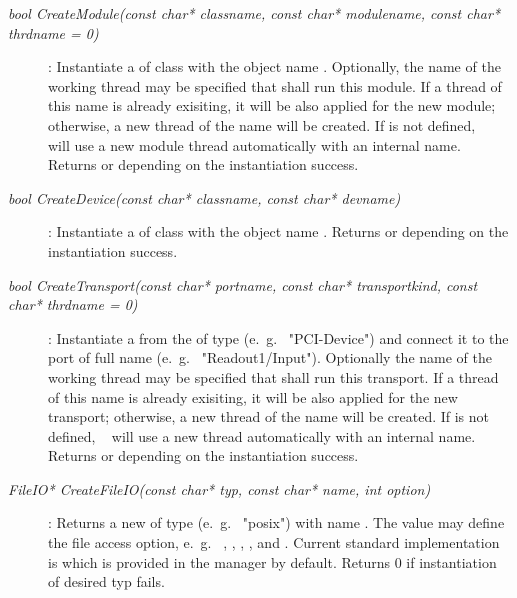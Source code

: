 \begin{description}
	 
\item[\em bool CreateModule\small (const char* classname, const char* modulename, const char* thrdname = 0)] : 
Instantiate a  of class  with the object name
. Optionally, the name of the working thread  may
be specified that shall run this module. If a thread of this name is already exisiting, 
it will be also applied for the new module; otherwise, a new thread of the name
will be created. If  is not defined, \dabc~ will use a new module
thread automatically with an internal name.
Returns  or  depending on the instantiation success.

\item[\em bool CreateDevice\small (const char* classname, const char* devname)]:
Instantiate a  of class  with the object name
. Returns  or  depending on the instantiation success.






\item[\em bool CreateTransport\small (const char* portname, const char* transportkind, const char* thrdname = 0)] :
Instantiate a  from the  of type  
(e.~g.~ "PCI-Device")
and connect it to the port of full name  (e.~g.~ "Readout1/Input"). 
Optionally the name of the working thread
 may
be specified that shall run this transport. If a thread of this name is already exisiting, 
it will be also applied for the new transport; otherwise, a new thread of the name
will be created. If  is not defined, \dabc~ will use a new 
thread automatically with an internal name.
Returns  or  depending on the instantiation success.


\item[\em FileIO* CreateFileIO\small (const char* typ, const char* name, int option)] :
Returns a new  of type  (e.~g.~ "posix") with name
. The  value may define the file access option,
e.~g.~ , , , , and 
. Current standard implementation is 
which is provided in the manager by default.
Returns $0$ if instantiation of desired typ fails.


\end{description}
